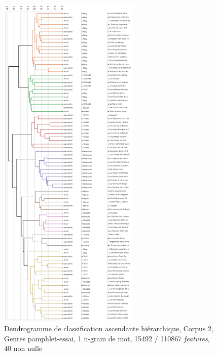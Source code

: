 \begin{figure}[H]
\centering %
\includegraphics[width=0.60\textwidth]{img/dendogram-corpus-2-PamEssai.png}
\caption{Dendrogramme de classification ascendante hiérarchique, Corpus 2, Genres pamphlet-essai, 1 n-gram de mot, 15492 / 110867 \textit{features}, 40 non nulle}
\label{'fig:dendogram-corpus-2-PamEssai'}
\end{figure}


